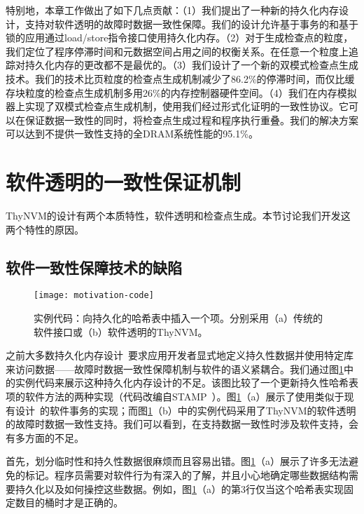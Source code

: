 特别地，本章工作做出了如下几点贡献：（1）我们提出了一种新的持久化内存设计，支持对软件透明的故障时数据一致性保障。我们的设计允许基于事务的和基于锁的应用通过load/store指令接口使用持久化内存。（2）对于生成检查点的粒度，我们定位了程序停滞时间和元数据空间占用之间的权衡关系。在任意一个粒度上追踪对持久化内存的更改都不是最优的。（3）我们设计了一个新的双模式检查点生成技术。我们的技术比页粒度的检查点生成机制减少了86.2\%的停滞时间，而仅比缓存块粒度的检查点生成机制多用26\%的内存控制器硬件空间。（4）我们在内存模拟器上实现了双模式检查点生成机制，使用我们经过形式化证明的一致性协议。它可以在保证数据一致性的同时，将检查点生成过程和程序执行重叠。我们的解决方案可以达到不提供一致性支持的全DRAM系统性能的95.1\%。

\section{软件透明的一致性保证机制}

ThyNVM的设计有两个本质特性，软件透明和检查点生成。本节讨论我们开发这两个特性的原因。

\subsection{软件一致性保障技术的缺陷}

\begin{figure}[!h]
\centering \texttt{[image: motivation-code]}
  \caption{实例代码：向持久化的哈希表中插入一个项。分别采用（a）传统的软件接口或（b）软件透明的ThyNVM。}
\label{fig:motivation-code}
\end{figure}

之前大多数持久化内存设计~\cite{Condit:2009:BIT:1629575.1629589,Volos:2011:MLP:1950365.1950379,Coburn:2011:NMP:1950365.1950380,Zhao:2013:KCP:2540708.2540744,Venkataraman:2011:CDD:1960475.1960480}要求应用开发者显式地定义持久性数据并使用特定库来访问数据——故障时数据一致性保障机制与软件的语义紧耦合。我们通过图\ref{fig:motivation-code}中的实例代码来展示这种持久化内存设计的不足。该图比较了一个更新持久性哈希表项的软件方法的两种实现（代码改编自STAMP~\cite{Cao:2008:STA}）。图\ref{fig:motivation-code}（a）展示了使用类似于现有设计~\cite{Condit:2009:BIT:1629575.1629589, Volos:2011:MLP:1950365.1950379}的软件事务的实现；而图\ref{fig:motivation-code}（b）中的实例代码采用了ThyNVM的软件透明的故障时数据一致性支持。我们可以看到，在支持数据一致性时涉及软件支持，会有多方面的不足。

首先，划分临时性和持久性数据很麻烦而且容易出错。图\ref{fig:motivation-code}（a）展示了许多无法避免的标记。程序员需要对软件行为有深入的了解，并且小心地确定哪些数据结构需要持久化以及如何操控这些数据。例如，图\ref{fig:motivation-code}（a）的第3行仅当这个哈希表实现固定数目的桶时才是正确的。

